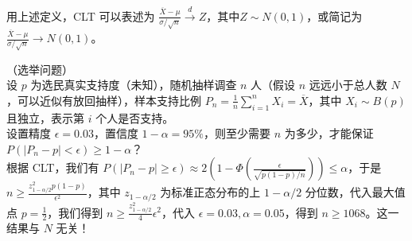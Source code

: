 \documentclass[../main.tex]{subfiles}
\begin{document}
用上述定义，CLT 可以表述为 $\frac{\overline X-\mu}{\sigma/\sqrt n}\overset{d}{\rightarrow}Z$，其中$Z\sim N(0,1)$，或简记为 $\frac{\overline X-\mu}{\sigma/\sqrt n}\rightarrow N(0,1)$。

\begin{example}
    （选举问题）\\
    设 $p$ 为选民真实支持度（未知），随机抽样调查 $n$ 人（假设 $n$ 远远小于总人数 $N$，可以近似有放回抽样），样本支持比例 $P_n=\frac1n\sum_{i=1}^nX_i=\overline X$，其中 $X_i\sim B(p)$ 且独立，表示第 $i$ 个人是否支持。\\
    设置精度 $\epsilon=0.03$，置信度 $1-\alpha=95\%$，则至少需要 $n$ 为多少，才能保证 $P(|P_n-p|<\epsilon)\geq1-\alpha$？\\
    根据 CLT，我们有 $P(|P_n-p|\geq\epsilon)\approx2\left(1-\Phi(\frac\epsilon{\sqrt{p(1-p)/n}})\right)\leq\alpha$，于是 $n\geq\frac{z_{1-\alpha/2}^2p(1-p)}{\epsilon^2}$，其中 $z_{1-\alpha/2}$ 为标准正态分布的上 $1-\alpha/2$ 分位数，代入最大值点 $p=\frac12$，我们得到 $n\geq\frac{z_{1-\alpha/2}^2}4\epsilon^2$，代入 $\epsilon=0.03,\alpha=0.05$，得到 $n\geq1068$。这一结果与 $N$ 无关！
\end{example}
\end{document}
